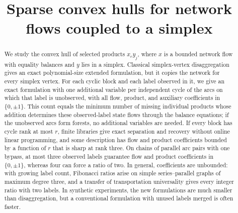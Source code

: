 \documentclass[11pt]{article}
\title{Sparse convex hulls for network flows coupled to a simplex}
\author{}
\date{}
\theoremstyle{definition}
\theoremstyle{remark}
\begin{document}
\maketitle
\begin{abstract}
We study the convex hull of selected products $x_ey_j$, where $x$ is a
bounded network flow with equality balances and $y$ lies in a simplex.
Classical simplex-vertex disaggregation gives an exact polynomial-size
extended formulation, but it copies the network for every simplex vertex.
For each cyclic block and each label observed in it, we give an exact
formulation with one additional variable per independent cycle of the arcs
on which that label is unobserved, with all flow, product, and auxiliary
coefficients in $\{0,\pm1\}$. This count equals the minimum number of missing
individual products whose addition determines these observed-label state
flows through the balance equations; if the unobserved arcs form forests, no
additional variables are needed. If every block has cycle rank at most $r$,
finite libraries give exact separation and recovery without online linear
programming, and some description has flow and product coefficients bounded
by a function of $r$ that is sharp at rank three. On chains of parallel arc
pairs with one bypass, at most three observed labels guarantee flow and
product coefficients in $\{0,\pm1\}$, whereas four can force a ratio of two.
In general, coefficients are unbounded: with growing label count, Fibonacci
ratios arise on simple series--parallel graphs of maximum degree three, and
a transfer of transportation universality gives every integer ratio with two
labels. In synthetic experiments, the new formulations are much smaller than
disaggregation, but a conventional formulation with unused labels merged is
often faster.
\end{abstract}














\end{document}
